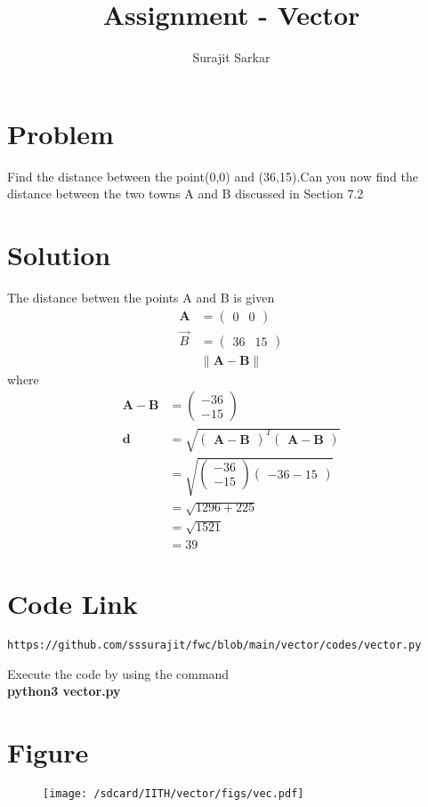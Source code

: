 \documentclass[journal,12pt,twocolumn]{IEEEtran}
\title{\mytitle}
\title{
Assignment - Vector
}
\author{Surajit Sarkar}
\newcommand{\myvec}[1]{\ensuremath{\begin{pmatrix}#1\end{pmatrix}}}
\providecommand{\norm}[1]{\lVert#1\rVert}
\let\vec\mathbf
\begin{document}
\maketitle
\tableofcontents
\bigskip
\section{\textbf{Problem}}
Find the distance between the point(0,0) and (36,15).Can you now find the distance between the two towns A and B discussed in Section 7.2
\section{\textbf{Solution}}
The distance betwen the points A and B is given
\begin{align}
\vec{A}&=\myvec{0 & 0} \\ 
\Vec{B}&=\myvec{36 & 15} \\ 
&\norm{\vec{A}-\vec{B}}
\end{align}
where
\begin{align}
\vec{A}-\vec{B}&=\myvec{-36\\-15} \\
\vec{d}&=\sqrt{\myvec{\vec{A}-\vec{B}}^T\myvec{\vec{A}-\vec{B}}} \\
&=\sqrt{\myvec{-36\\-15}{\myvec{-36-15}}} \\
&=\sqrt{1296+225} \\
&=\sqrt{1521} \\
&=39
\end{align}
\section{\textbf{Code Link}}
\begin{lstlisting}
https://github.com/sssurajit/fwc/blob/main/vector/codes/vector.py
\end{lstlisting}
Execute the code by using the command\\
\textbf{python3 vector.py}
\section{\textbf{Figure}}
\begin{figure}[!h]
\centering
\texttt{[image: /sdcard/IITH/vector/figs/vec.pdf]}
\caption{}
\label{fig:vec}
\end{figure}
\end{document}
